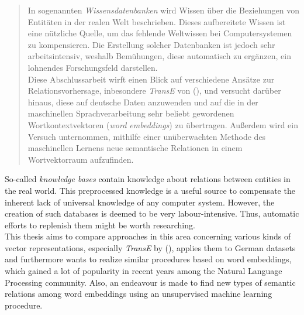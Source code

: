 \documentclass[
captions=nooneline,
11pt, %
ngerman, %
singlespacing, %
headsepline, %
]{MastersDoctoralThesis} %
\begin{document}
\begin{abstract}
\addchaptertocentry{\abstractname} %

In sogenannten \emph{Wissensdatenbanken} wird Wissen über die Beziehungen von Entitäten in der realen Welt
beschrieben. Dieses aufbereitete Wissen ist eine nützliche Quelle, um das fehlende Weltwissen
bei Computersystemen zu kompensieren. Die Erstellung solcher Datenbanken ist jedoch sehr
arbeitsintensiv, weshalb Bemühungen, diese automatisch zu ergänzen, ein lohnendes Forschungsfeld darstellen.\\

Diese Abschlussarbeit wirft einen Blick auf verschiedene Ansätze zur Relationsvorhersage, inbesondere \emph{TransE}
von (\cite{bordes2013translating}), und versucht darüber hinaus, diese auf deutsche Daten anzuwenden und auf
die in der maschinellen Sprachverarbeitung sehr beliebt gewordenen Wortkontextvektoren
(\emph{word embeddings}) zu übertragen. Außerdem wird ein Versuch unternommen, mithilfe einer
unüberwachten Methode des maschinellen Lernens neue semantische Relationen in einem Wortvektorraum
aufzufinden.

\end{abstract}


\begin{abstracteng}

So-called \emph{knowledge bases} contain knowledge about relations between entities in
the real world. This preprocessed knowledge is a useful source to compensate the inherent lack of universal knowledge
of any computer system. However, the creation of such databases is deemed to be very labour-intensive.
Thus, automatic efforts to replenish them might be worth researching.\\

This thesis aims to compare approaches in this area concerning various kinds of
vector representations, especially \emph{TransE} by (\cite{bordes2013translating}),
 applies them to German datasets and furthermore wants to realize similar procedures based on word embeddings,
which gained a lot of popularity in recent years among the Natural Language Processing community.
Also, an endeavour is made to find new types of semantic relations among word embeddings using
an unsupervised machine learning procedure.

\end{abstracteng}
\end{document}
